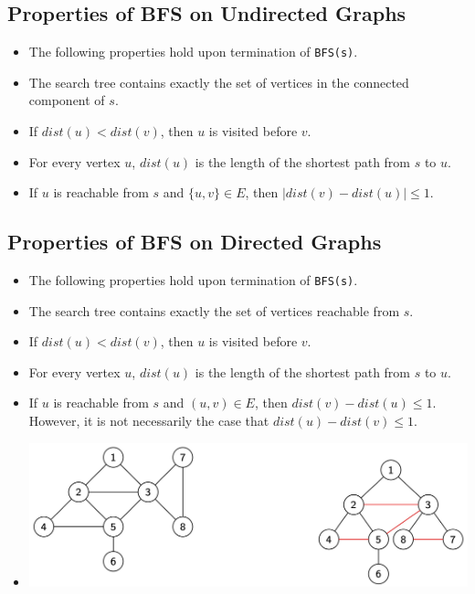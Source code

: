 \documentclass[12pt]{article}
\begin{document}
\subsection{Properties of BFS on Undirected Graphs}
\begin{itemize}
    \item The following properties hold upon termination of \texttt{BFS(s)}.
    \item The search tree contains exactly the set of vertices in the connected component of $s$.
    \item If $dist(u) < dist(v)$, then $u$ is visited before $v$.
    \item For every vertex $u$, $dist(u)$ is the length of the shortest path from $s$ to $u$.
    \item If $u$ is reachable from $s$ and $\{ u, v \} \in E$, then $\left|dist(v) - dist(u)\right| \leq 1$.
\end{itemize}

\subsection{Properties of BFS on Directed Graphs}
\begin{itemize}
    \item The following properties hold upon termination of \texttt{BFS(s)}.
    \item The search tree contains exactly the set of vertices reachable from $s$.
    \item If $dist(u) < dist(v)$, then $u$ is visited before $v$.
    \item For every vertex $u$, $dist(u)$ is the length of the shortest path from $s$ to $u$.
    \item If $u$ is reachable from $s$ and $(u, v) \in E$, then $dist(v) - dist(u) \leq 1$. However, it is not necessarily the case that $dist(u) - dist(v) \leq 1$.
    \item[] \includegraphics[width=\textwidth]{images/bfs-undirected--layers-example.jpg}
\end{itemize}
\end{document}
